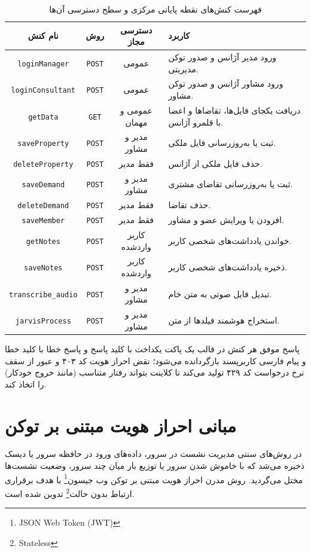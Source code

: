\documentclass[11pt, a4paper]{report}
\newcommand{\enfootnote}[1]{\footnote{\foreignlanguage{english}{#1}}}
\newcommand{\code}[1]{\foreignlanguage{english}{\texttt{#1}}}
\begin{document}
\begin{table}[htbp]
\centering
\caption{فهرست کنش‌های نقطه پایانی مرکزی و سطح دسترسی آن‌ها}
\label{tab:api_actions}
\renewcommand{\arraystretch}{1.5}
\begin{tabular}{|c|c|c|p{5.5cm}|}
\hline
\textbf{نام کنش} & \textbf{روش} & \textbf{دسترسی مجاز} & \textbf{کاربرد} \\ \hline
\code{loginManager} & \code{POST} & عمومی & ورود مدیر آژانس و صدور توکن مدیریتی. \\ \hline
\code{loginConsultant} & \code{POST} & عمومی & ورود مشاور آژانس و صدور توکن مشاور. \\ \hline
\code{getData} & \code{GET} & عمومی و مهمان & دریافت یکجای فایل‌ها، تقاضاها و اعضا با قلمرو آژانس. \\ \hline
\code{saveProperty} & \code{POST} & مدیر و مشاور & ثبت یا به‌روزرسانی فایل ملکی. \\ \hline
\code{deleteProperty} & \code{POST} & فقط مدیر & حذف فایل ملکی از آژانس. \\ \hline
\code{saveDemand} & \code{POST} & مدیر و مشاور & ثبت یا به‌روزرسانی تقاضای مشتری. \\ \hline
\code{deleteDemand} & \code{POST} & فقط مدیر & حذف تقاضا. \\ \hline
\code{saveMember} & \code{POST} & فقط مدیر & افزودن یا ویرایش عضو و مشاور. \\ \hline
\code{getNotes} & \code{POST} & کاربر واردشده & خواندن یادداشت‌های شخصی کاربر. \\ \hline
\code{saveNotes} & \code{POST} & کاربر واردشده & ذخیره یادداشت‌های شخصی کاربر. \\ \hline
\code{transcribe\_audio} & \code{POST} & مدیر و مشاور & تبدیل فایل صوتی به متن خام. \\ \hline
\code{jarvisProcess} & \code{POST} & مدیر و مشاور & استخراج هوشمند فیلدها از متن. \\ \hline
\end{tabular}
\end{table}

پاسخ موفق هر کنش در قالب یک پاکت یکداخت با کلید پاسخ و پاسخ خطا با کلید خطا و پیام فارسی کاربرپسند بازگردانده می‌شود؛ نقض احراز هویت کد ۴۰۳ و عبور از سقف نرخ درخواست کد ۴۲۹ تولید می‌کند تا کلاینت بتواند رفتار متناسب (مانند خروج خودکار) را اتخاذ کند.

\section{مبانی احراز هویت مبتنی بر توکن}
در روش‌های سنتی مدیریت نشست در سرور، داده‌های ورود در حافظه سرور یا دیسک ذخیره می‌شد که با خاموش شدن سرور یا توزیع بار میان چند سرور، وضعیت نشست‌ها مختل می‌گردید. روش مدرن احراز هویت مبتنی بر توکن وب جیسون\enfootnote{JSON Web Token (JWT)} با هدف برقراری ارتباط بدون حالت\enfootnote{Stateless} تدوین شده است.
\end{document}
